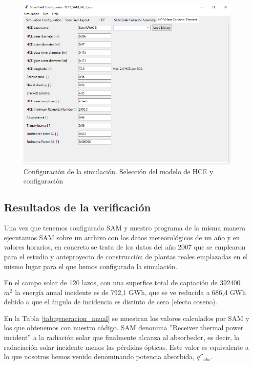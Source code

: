 \begin{figure}[H]
\includegraphics[width=0.9\linewidth]{images/interface05.png}
\caption{Configuración de la simulación. Selección del modelo de HCE y configuración} 
\label{fig:interface05}
\end{figure}

\subsection{Resultados de la verificación}
\label{resultados-validacion}
 
Una vez que tenemos configurado SAM y nuestro programa de la misma manera ejecutamos SAM sobre un archivo con los datos meteorológicos de un año y en valores horarios, en concreto se trata de los datos del año 2007 que se emplearon para el estudio y anteproyecto de construcción de plantas reales emplazadas en el mismo lugar para el que hemos configurado la simulación.  

En el campo solar de 120 lazos, con una superfice total de captación de 392400 $m^2$ la energía anual incidente es de 792,1 GWh, que se ve reducida a 686,4 GWh debido a que el ángulo de incidencia es distinto de cero (efecto coseno).

En la Tabla \ref{tab:generacion_anual} se muestran los valores  calculados por SAM y los que obtenemos con nuestro código. SAM denonima ''Receiver thermal power incident'' a la radiación solar que finalmente alcanza al absorbedor, es decir, la radaciación solar incidente menos las pérdidas ópticas. Este valor es equivalente a lo que nosotros hemos venido denominando potencia absorbida, $\dot q''_{abs}$. 

